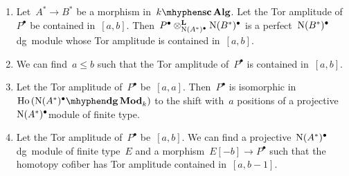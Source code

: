 \begin{refsection}
\begin{proposition}
\begin{enumerate}
    \item\label{enumerate:Tor-amplitude-4} Let~$A^*\to B^*$ be a morphism in~$\scAlg{k}$. Let the Tor amplitude of~$P^\bullet$ be contained in~$[a,b]$. Then~$P^\bullet\otimes_{\operatorname{N}(A^*)^\bullet}^{\mathbf{L}}\operatorname{N}(B^*)^\bullet$ is a perfect~$\operatorname{N}(B^*)^\bullet$\dash dg~module whose Tor amplitude is contained in~$[a,b]$.
    \item\label{enumerate:Tor-amplitude-5} We can find~$a\leq b$ such that the Tor amplitude of~$P^\bullet$ is contained in~$[a,b]$.
    \item\label{enumerate:Tor-amplitude-6} Let the Tor amplitude of~$P^\bullet$ be~$[a,a]$. Then~$P^\bullet$ is isomorphic in~$\Ho(\dgMod{\nerve(A^*)^\bullet}_k)$ to the shift with~$a$ positions of a projective~$\operatorname{N}(A^*)^\bullet$\dash module of finite type.
    \item\label{enumerate:Tor-amplitude-7} Let the Tor amplitude of~$P^\bullet$ be~$[a,b]$. We can find a projective~$\operatorname{N}(A^*)^\bullet$\dash dg~module of finite type~$E$ and a morphism~$E[-b]\to P^\bullet$ such that the homotopy cofiber has Tor amplitude contained in~$[a,b-1]$.
  \end{enumerate}
\end{proposition}



\end{refsection}
